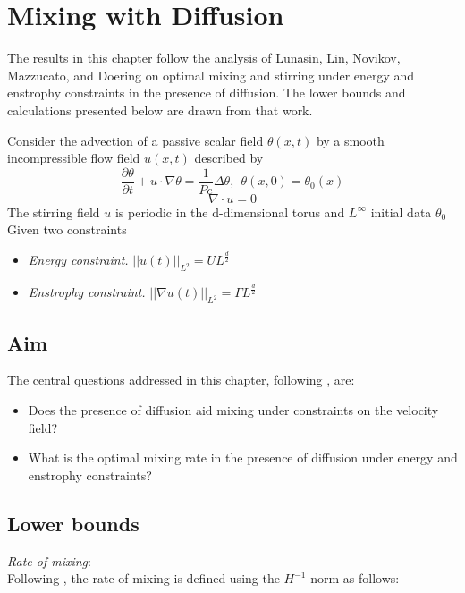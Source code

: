 \documentclass[12pt]{report}   %
\numberwithin{equation}{section}
\theoremstyle{plain}
\theoremstyle{definition}
\theoremstyle{remark}
\begin{document}
\chapter{Mixing with Diffusion}
The results in this chapter follow the analysis of Lunasin, Lin, Novikov, Mazzucato, and Doering \cite{LunasinLinEA12} on optimal mixing and stirring under energy and enstrophy constraints in the presence of diffusion. The lower bounds and calculations presented below are drawn from that work.

Consider the advection of a passive scalar field $\theta(x,t)$ by a smooth incompressible flow field $u(x,t)$ described by 
   	 \begin{equation} \label{peq:1}
   	  \frac{\partial\theta}{\partial t} + u\cdot\nabla\theta = \frac{1}{Pe}\Delta\theta, ~~ \theta(x,0) = \theta_0 (x) 
   	  \end{equation}
   	  \begin{equation}
   	  \nabla \cdot u = 0
   	  \end{equation}
   	 The stirring field $u$ is periodic in the d-dimensional torus and $L^{\infty}$ initial data $\theta_0$ \\ 
Given two constraints
   	\begin{itemize}
   	\item \textit{Energy constraint.}  $|| u(t) ||_{L^2} = UL^\frac{d}{2}$
   	\item \textit{Enstrophy constraint.} $|| \nabla u(t) ||_{L^2} = \Gamma L^\frac{d}{2}$
   	\end{itemize}
 

\section{Aim}
The central questions addressed in this chapter, following \cite{LunasinLinEA12}, are:
  \begin{itemize}
  \item Does the presence of diffusion aid mixing under constraints on the velocity field?
  \item What is the optimal mixing rate in the presence of diffusion under energy and enstrophy constraints?
  \end{itemize}
 
 \section{Lower bounds}
 \textit{Rate of mixing}: \\
Following \cite{LunasinLinEA12}, the rate of mixing is defined using the $H^{-1}$ norm as follows:
 
\end{document}
